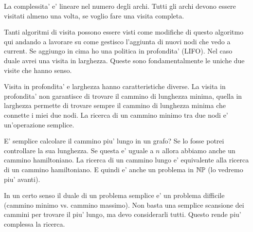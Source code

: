 La complessita' e' lineare nel numero degli archi. Tutti gli archi devono essere visitati almeno una
volta, se voglio fare una visita completa.

Tanti algoritmi di visita possono essere visti come modifiche di questo algoritmo qui andando a
lavorare su come gestisco l'aggiunta di nuovi nodi che vedo a current. Se aggiungo in cima ho una
politica in profondita' (LIFO). Nel caso duale avrei una visita in larghezza. Queste sono
fondamentalmente le uniche due visite che hanno senso.

Visita in profondita' e larghezza hanno caratteristiche diverse. La visita in profondita' non
garantisce di trovare il cammino di lunghezza minima, quella in larghezza permette di trovare sempre
il cammino di lunghezza minima che connette i miei due nodi. La ricerca di un cammino minimo tra due
nodi e' un'operazione semplice.

E' semplice calcolare il cammino piu' lungo in un grafo? Se lo fosse potrei controllare la sua
lunghezza. Se questa e' uguale a $n$ allora abbiamo anche un cammino hamiltoniano. La ricerca di un
cammino lungo e' equivalente alla ricerca di un cammino hamiltoniano. E quindi e' anche un problema
in $\mathbb{NP}$ (lo vedremo piu' avanti).

In un certo senso il duale di un problema semplice e' un problema difficile (cammino minimo vs.
cammino massimo). Non basta una semplice scansione dei cammini per trovare il piu' lungo, ma devo
considerarli tutti. Questo rende piu' complessa la ricerca.
